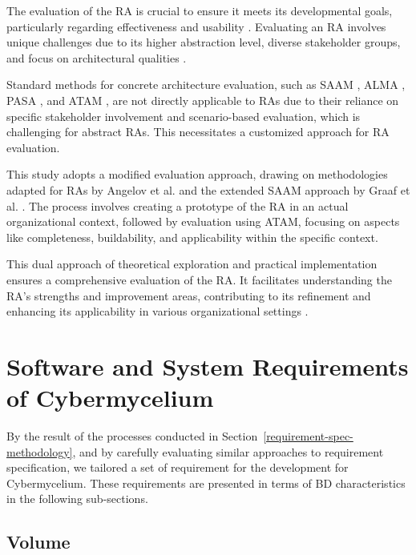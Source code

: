 \documentclass[review]{elsarticle}
\begin{document}
The evaluation of the RA is crucial to ensure it meets its developmental goals, particularly regarding effectiveness and usability \cite{galster2011empirically}. Evaluating an RA involves unique challenges due to its higher abstraction level, diverse stakeholder groups, and focus on architectural qualities \cite{angelov2008contracting, Avgeriou, Cioroaica, Maier}.

Standard methods for concrete architecture evaluation, such as SAAM \cite{kazman1994saam}, ALMA \cite{Bengtsson}, PASA \cite{Williams}, and ATAM \cite{KazmanATAM}, are not directly applicable to RAs due to their reliance on specific stakeholder involvement and scenario-based evaluation, which is challenging for abstract RAs. This necessitates a customized approach for RA evaluation.

This study adopts a modified evaluation approach, drawing on methodologies adapted for RAs by Angelov et al. \cite{angelov2008towards} and the extended SAAM approach by Graaf et al. \cite{graaf2005evaluating}. The process involves creating a prototype of the RA in an actual organizational context, followed by evaluation using ATAM, focusing on aspects like completeness, buildability, and applicability within the specific context.

This dual approach of theoretical exploration and practical implementation ensures a comprehensive evaluation of the RA. It facilitates understanding the RA's strengths and improvement areas, contributing to its refinement and enhancing its applicability in various organizational settings \cite{sharpe2019industrial, rohling2019reference, Nakagawa}.



\section{Software and System Requirements of Cybermycelium} \label{requirements-section}

By the result of the processes conducted in Section~\ref{requirement-spec-methodology}, and by carefully evaluating similar approaches to requirement specification, we tailored a set of requirement for the development for Cybermycelium. These requirements are presented in terms of BD characteristics in the following sub-sections.


\subsection{Volume}
\end{document}
